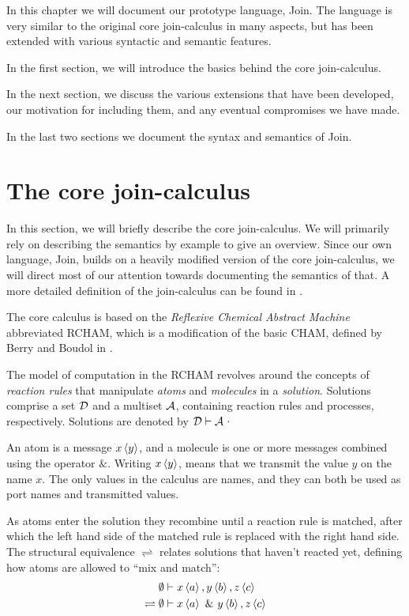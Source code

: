 
In this chapter we will document our prototype language, Join.  The
language is very similar to the original core join-calculus in many
aspects, but has been extended with various syntactic and semantic
features.

In the first section, we will introduce the basics behind the core
join-calculus.

In the next section, we discuss the various extensions that have been
developed, our motivation for including them, and any eventual compromises we
have made.

In the last two sections we document the syntax and semantics of Join.

\section{The core join-calculus}

In this section, we will briefly describe the core join-calculus. We will
primarily rely on describing the semantics by example to give an overview.
Since our own language, Join, builds on a heavily modified version of the core
join-calculus, we will direct most of our attention towards documenting the
semantics of that. A more detailed definition of the join-calculus can be found
in \cite{fournet1996reflexive}.

The core calculus is based on the \emph{Reflexive Chemical Abstract Machine}
abbreviated RCHAM, which is a modification of the basic CHAM, defined by Berry
and Boudol in \cite{berry1989chemical}.

The model of computation in the RCHAM revolves around the concepts of
\emph{reaction rules} that manipulate \emph{atoms} and \emph{molecules} in a
\emph{solution}. Solutions comprise a set $\mathcal{D}$ and a multiset $\mathcal{A}$, containing
reaction rules and processes, respectively. Solutions are denoted by $\mathcal{D} \vdash
\mathcal{A}$·

An atom is a message $\atm x<y>$, and a molecule is one or more
messages combined using the operator $\&$. Writing $\atm x<y>$, means that we
transmit the value $y$ on the name $x$. The only values in the calculus are
names, and they can both be used as port names and transmitted values.

As atoms enter the solution they recombine until a reaction rule is matched,
after which the left hand side of the matched rule is replaced with the right
hand side. The structural equivalence $\rightleftharpoons$ relates solutions
that haven't reacted yet, defining how atoms are allowed to ``mix and match'':
\begin{align*}
                  & \emptyset \vdash \atm x<a>, \atm y<b>, \atm z<c> \\
\rightleftharpoons{}& \emptyset \vdash \atm x<a> ~\& ~\atm y<b>, \atm z<c>
\end{align*}

